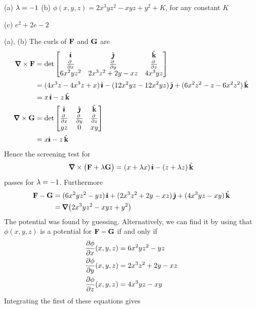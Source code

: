 \begin{answer} 
(a) $\lambda=-1$\qquad
(b) $\phi(x,y,z)=2x^3yz^2-xyz+y^2+K$, for any constant $K$

(c) $e^2+2e-2$
\end{answer}

\begin{solution}
(a), (b) The curls of $\mathbf{F}$ and $\mathbf{G}$ are
\begin{align*}
\vnabla\times\vF
&= \det\left[\begin{matrix}
                       \hi &       \hj        &   \hk \\
               \pdiff{}{x} &   \pdiff{}{y}    &  \pdiff{}{z} \\
                  6x^2yz^2 & 2x^3z^2 + 2y - xz &  4x^3yz
            \end{matrix}\right] \\
&=(4x^3z-4x^3z+x)\,\hi-(12x^2yz-12x^2yz)\,\hj+(6x^2z^2-z-6x^2z^2)\,\hk \\
&=x\,\hi-z\,\hk\\
\vnabla\times\vG
&=\det\left[\begin{matrix}
                   \hi       &   \hj       &  \hk \\
                 \pdiff{}{x} & \pdiff{}{y} &  \pdiff{}{z} \\
                          yz &      0      & xy
\end{matrix}\right] \\
&=x\hi-z\,\hk
\end{align*}
Hence the screening test for
\begin{equation*}
\vnabla\times\big(\vF+\la\vG\big)=(x+\la x)\,\hi-(z+\la z)\,\hk
\end{equation*}
passes for $\lambda=-1$. Furthermore
\begin{align*}
\vF-\vG &=(6x^2yz^2-yz)\,\hi+(2x^3z^2 + 2y - xz)\,\hj+(4x^3yz-xy)\,\hk \\
&=\vnabla\big(2x^3yz^2-xyz+y^2\big)
\end{align*}
The potential was found by guessing. Alternatively,
we can find it by using that
$\phi(x,y,z)$ is a potential for $\mathbf{F}-\mathbf{G}$ 
if and only if
\begin{align*}
\pdiff{\phi}{x}(x,y,z) &= 6x^2yz^2-yz \\
\pdiff{\phi}{y}(x,y,z) &= 2x^3z^2 + 2y - xz \\
\pdiff{\phi}{z}(x,y,z) &= 4x^3yz-xy
\end{align*}
Integrating the first of these equations gives
\begin{equation*}

\end{equation*}
\end{solution}
